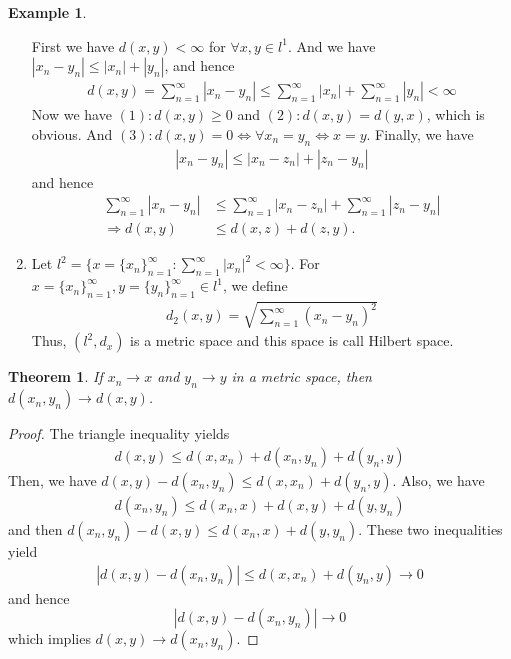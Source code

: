 \documentclass[12pt,leqno]{amsart}
\newtheorem{theorem}{Theorem}[section]
\theoremstyle{definition}
\newtheorem{example}{Example}[section]
\numberwithin{equation}{subsection}
\begin{document}
\begin{example}
\begin{enumerate}
    First we have $d(x,y) < \infty$ for $\forall x,y \in l^1$. And we   have $|x_n-y_n|\leq |x_n|+|y_n|$, and hence
    \begin{align*}
        d(x,y) = \sum^\infty_{n=1} |x_n - y_n| \leq \sum^\infty_{n=1} |x_n| + \sum^\infty_{n=1} |y_n| < \infty
    \end{align*}
    Now we have $(1):d(x,y) \geq 0$ and $(2):d(x,y) = d(y,x)$, which is     obvious. And $(3): d(x,y) = 0 \Leftrightarrow \forall x_n = y_n \Leftrightarrow x =     y$. Finally, we have 
    \begin{align*}
        |x_n - y_n| \leq |x_n - z_n| + |z_n - y_n|
    \end{align*}
    and hence 
    \begin{align*}
        \sum^\infty_{n=1}|x_n - y_n| & \leq \sum^\infty_{n=1}|x_n - z_n| +     \sum^\infty_{n=1}|z_n - y_n|\\
        \Rightarrow d(x,y) & \leq d(x,z) + d(z,y).
    \end{align*}
    \item Let $l^2 = \{x = \{x_n\}^\infty_{n=1}: \sum^\infty_{n=1}|x_n|^2 < \infty\}$. For $x = \{x_n\}^\infty_{n=1}, y = \{y_n\}^\infty_{n=1} \in l^1$, we define
    \begin{align*}
        d_2(x,y) = \sqrt{\sum^\infty_{n=1} (x_n - y_n)^2}
    \end{align*}
    Thus, $(l^2, d_x)$ is a metric space and this space is call Hilbert space.
\end{enumerate}
\end{example} 

\medskip

\begin{theorem}
If $x_n\rightarrow x$ and $y_n\rightarrow y$ in a metric space, then $d(x_n, y_n) \rightarrow d(x,y)$.
\end{theorem}
\begin{proof}
The triangle inequality yields 
\begin{align*}
    d(x,y) \leq d(x,x_n) + d(x_n,y_n) + d(y_n,y)
\end{align*}
Then, we have $d(x,y) - d(x_n,y_n) \leq d(x,x_n) + d(y_n,y)$. Also, we have 
\begin{align*}
    d(x_n,y_n)\leq d(x_n,x) + d(x,y) + d(y,y_n)
\end{align*}
and then $d(x_n,y_n) - d(x,y)\leq d(x_n,x) + d(y,y_n)$. These two inequalities yield 
\begin{align*}
    |d(x,y) - d(x_n,y_n)| \leq d(x,x_n) + d(y_n,y) \to 0 
\end{align*}
and hence $$|d(x,y) - d(x_n,y_n)| \to 0 $$ which implies $d(x,y) \to d(x_n,y_n)$.
\end{proof}
\end{document}
